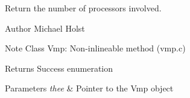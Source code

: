 Return the number of processors involved. 

\begin{DoxyAuthor}{Author}
Michael Holst 
\end{DoxyAuthor}
\begin{DoxyNote}{Note}
Class Vmp\-: Non-\/inlineable method (vmp.\-c) 
\end{DoxyNote}
\begin{DoxyReturn}{Returns}
Success enumeration 
\end{DoxyReturn}

\begin{DoxyParams}{Parameters}
{\em thee} & Pointer to the Vmp object \\
\hline
\end{DoxyParams}
